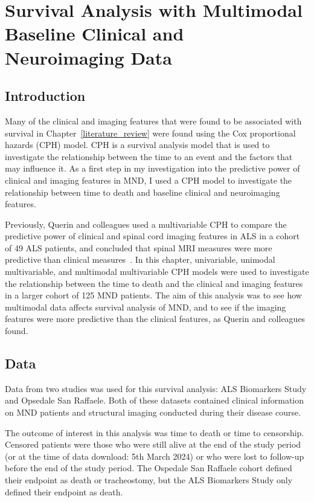 \chapter{Survival Analysis with Multimodal Baseline Clinical and Neuroimaging Data}
\label{cox_proportional_hazards_model}

\section{Introduction}

Many of the clinical and imaging features that were found to be associated with survival in Chapter~\ref{literature_review} were found using the Cox proportional hazards (CPH) model.
CPH is a survival analysis model that is used to investigate the relationship between the time to an event and the factors that may influence it.
As a first step in my investigation into the predictive power of clinical and imaging features in MND, I used a CPH model to investigate the relationship between time to death and baseline clinical and neuroimaging features.

Previously, Querin and colleagues used a multivariable CPH to compare the predictive power of clinical and spinal cord imaging features in ALS in a cohort of 49 ALS patients, and concluded that spinal MRI measures were more predictive than clinical measures~\cite{querinSpinalCordMultiparametric2017}.
In this chapter, univariable, unimodal multivariable, and multimodal multivariable CPH models were used to investigate the relationship between the time to death and the clinical and imaging features in a larger cohort of 125 MND patients.
The aim of this analysis was to see how multimodal data affects survival analysis of MND, and to see if the imaging features were more predictive than the clinical features, as Querin and colleagues found.

\section{Data}

Data from two studies was used for this survival analysis: ALS Biomarkers Study and Opsedale San Raffaele.
Both of these datasets contained clinical information on MND patients and structural imaging conducted during their disease course.

The outcome of interest in this analysis was time to death or time to censorship.
Censored patients were those who were still alive at the end of the study period (or at the time of data download: 5th March 2024) or who were lost to follow-up before the end of the study period.
The Ospedale San Raffaele cohort defined their endpoint as death or tracheostomy, but the ALS Biomarkers Study only defined their endpoint as death.

